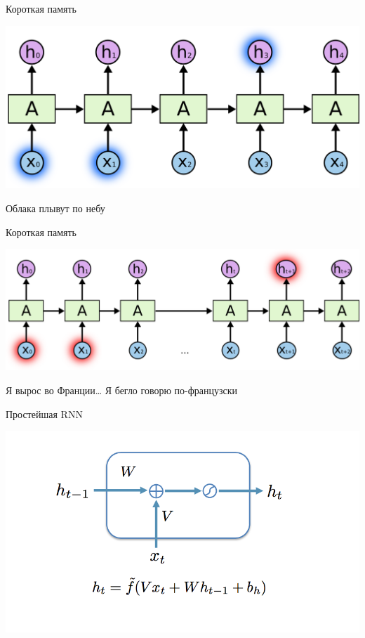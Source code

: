 \documentclass[notes,12pt, aspectratio=169]{beamer}
\begin{document}
\begin{frame}{Короткая память}
\begin{center}
	\includegraphics[width=.7\linewidth]{simple_rnn1.png}
\end{center}

\large Облака плывут по небу 
\end{frame}


\begin{frame}{Короткая память}
\begin{center}
	\includegraphics[width=.8\linewidth]{simple_rnn2.png}
\end{center}

\large Я вырос во Франции… Я бегло говорю по-французски
\end{frame}


\begin{frame}{Простейшая RNN}
\begin{center}
	\includegraphics[width=.8\linewidth]{rnn14.png}
\end{center}
\end{frame}
\end{document}
